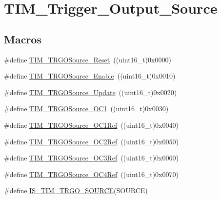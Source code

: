 \hypertarget{group___t_i_m___trigger___output___source}{}\section{T\+I\+M\+\_\+\+Trigger\+\_\+\+Output\+\_\+\+Source}
\label{group___t_i_m___trigger___output___source}
\subsection*{Macros}
\begin{DoxyCompactItemize}
\item 
\#define \mbox{\hyperlink{group___t_i_m___trigger___output___source_gafb039ed39279a4d1134b234797b1cdfb}{T\+I\+M\+\_\+\+T\+R\+G\+O\+Source\+\_\+\+Reset}}~((uint16\+\_\+t)0x0000)
\item 
\#define \mbox{\hyperlink{group___t_i_m___trigger___output___source_gaa228ba6cfafcf676e33e3ee35cb7fc1c}{T\+I\+M\+\_\+\+T\+R\+G\+O\+Source\+\_\+\+Enable}}~((uint16\+\_\+t)0x0010)
\item 
\#define \mbox{\hyperlink{group___t_i_m___trigger___output___source_ga8a73c717070ab1a0ef90326780f20aef}{T\+I\+M\+\_\+\+T\+R\+G\+O\+Source\+\_\+\+Update}}~((uint16\+\_\+t)0x0020)
\item 
\#define \mbox{\hyperlink{group___t_i_m___trigger___output___source_ga2d044b472c021f5484b9f71eb9ca69f1}{T\+I\+M\+\_\+\+T\+R\+G\+O\+Source\+\_\+\+O\+C1}}~((uint16\+\_\+t)0x0030)
\item 
\#define \mbox{\hyperlink{group___t_i_m___trigger___output___source_ga7cb70a2a026dc02136bdbb3dcc483d6c}{T\+I\+M\+\_\+\+T\+R\+G\+O\+Source\+\_\+\+O\+C1\+Ref}}~((uint16\+\_\+t)0x0040)
\item 
\#define \mbox{\hyperlink{group___t_i_m___trigger___output___source_ga059f9f6cf96c833180eb3cdf5e56bd04}{T\+I\+M\+\_\+\+T\+R\+G\+O\+Source\+\_\+\+O\+C2\+Ref}}~((uint16\+\_\+t)0x0050)
\item 
\#define \mbox{\hyperlink{group___t_i_m___trigger___output___source_ga40943bc1c3f22b983c683cbf0e87a218}{T\+I\+M\+\_\+\+T\+R\+G\+O\+Source\+\_\+\+O\+C3\+Ref}}~((uint16\+\_\+t)0x0060)
\item 
\#define \mbox{\hyperlink{group___t_i_m___trigger___output___source_gafc81561599199912d613c65f760919bc}{T\+I\+M\+\_\+\+T\+R\+G\+O\+Source\+\_\+\+O\+C4\+Ref}}~((uint16\+\_\+t)0x0070)
\item 
\#define \mbox{\hyperlink{group___t_i_m___trigger___output___source_gadf4e4e0422bd9c108b184884781d2d46}{I\+S\+\_\+\+T\+I\+M\+\_\+\+T\+R\+G\+O\+\_\+\+S\+O\+U\+R\+CE}}(S\+O\+U\+R\+CE)
\end{DoxyCompactItemize}


